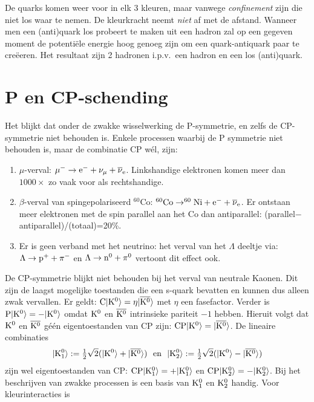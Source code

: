 De quarks komen weer voor in elk 3 kleuren, maar vanwege {\it confinement}
zijn die niet los waar te nemen. De kleurkracht neemt {\it niet} af met de
afstand. Wanneer men een (anti)quark los probeert te maken uit een hadron zal
op een gegeven moment de potenti\"ele energie hoog genoeg zijn om een
quark-antiquark paar te cre\"eeren. Het resultaat zijn 2 hadronen i.p.v.\ een
hadron en een los (anti)quark.

\section[~~P en CP-schending]{P en CP-schending}
Het blijkt dat onder de zwakke wisselwerking de P-symmetrie, en zelfs de
CP-symmetrie niet behouden is. Enkele processen waarbij de P symmetrie niet
behouden is, maar de combinatie CP w\'el, zijn:
\begin{enumerate}
\item $\mu$-verval: $\mu^-\rightarrow {\rm e}^-+\nu_\mu+\overline{\nu}_{\rm e}$.
      Linkshandige elektronen komen meer dan $1000\times$ zo vaak voor als
      rechtshandige.
\item $\beta$-verval van spingepolariseerd $^{60}$Co:
      $\rm ^{60}Co\rightarrow^{60}Ni+e^-+\overline{\nu}_e$. Er ontstaan meer
      elektronen met de spin parallel aan het Co dan antiparallel:
      (parallel$-$antiparallel)/(totaal)=20\%.
\item Er is geen verband met het neutrino: het verval van het $\Lambda$
      deeltje via: $\Lambda\rightarrow{\rm p}^++\pi^-$ en
      $\Lambda\rightarrow{\rm n}^0+\pi^0$ vertoont dit effect ook.
\end{enumerate}
De CP-symmetrie blijkt niet behouden bij het verval van neutrale Kaonen. Dit
zijn de laagst mogelijke toestanden die een s-quark bevatten en kunnen dus
alleen zwak vervallen. Er geldt: $\rm C|K^0\rangle=\eta|\overline{K^0}\rangle$
met $\eta$ een fasefactor. Verder is $\rm P|K^0\rangle=-|K^0\rangle$ omdat
$\rm K^0$ en $\rm\overline{K^0}$ intrinsieke pariteit $-1$ hebben. Hieruit
volgt dat $\rm K^0$ en $\rm\overline{K^0}$ g\'e\'en eigentoestanden van CP
zijn: $\rm CP|K^0\rangle=|\overline{K^0}\rangle$. De lineaire combinaties
\[
\rm|K_1^0\rangle:=\mbox{$\frac{1}{2}$}\sqrt{2}(|K^0\rangle+|\overline{K^0}\rangle)~~\mbox{en}~~
|K_2^0\rangle:=\mbox{$\frac{1}{2}$}\sqrt{2}(|K^0\rangle-|\overline{K^0}\rangle)
\]
zijn wel eigentoestanden van CP: $\rm CP|K_1^0\rangle=+|K_1^0\rangle$ en
$\rm CP|K_2^0\rangle=-|K_2^0\rangle$. Bij het beschrijven van zwakke processen
is een basis van $\rm K_1^0$ en $\rm K_2^0$ handig. Voor kleurinteracties is
